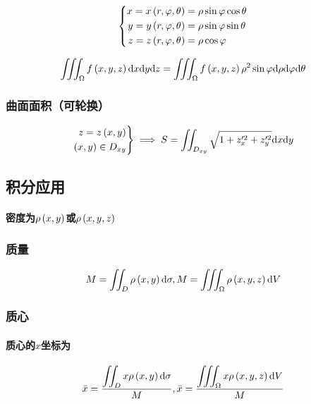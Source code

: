 \documentclass{article}
\begin{document}
\[\left\{\begin{aligned}
        x=x\left(r,\varphi,\theta\right) & =\rho\sin\varphi\cos\theta \\
        y=y\left(r,\varphi,\theta\right) & =\rho\sin\varphi\sin\theta \\
        z=z\left(r,\varphi,\theta\right) & =\rho\cos\varphi           \\
    \end{aligned}\right.\]

\[\iiint_\Omega f\left(x,y,z\right)\mathrm d x\mathrm d y\mathrm d z=
    \iiint_\Omega f\left(x,y,z\right)\rho^2\sin\varphi\mathrm d\rho\mathrm d\varphi\mathrm d\theta\]

\subsubsection{曲面面积（可轮换）}

\[\left.\begin{aligned}
        z=z\left(x,y\right) \\
        \left(x,y\right)\in D_{xy}
    \end{aligned}\right\}\implies
    S=\iint_{D_{xy}}\sqrt{1+z^{\prime2}_x+z^{\prime2}_y}\mathrm d x\mathrm d y\]

\subsection{积分应用}

\paragraph{密度为$\rho\left(x,y\right)$或$\rho\left(x,y,z\right)$}

\subsubsection{质量}

\[M=\iint_D\rho\left(x,y\right)\mathrm d\sigma,
    M=\iiint_\Omega\rho\left(x,y,z\right)\mathrm d V\]

\subsubsection{质心}

\paragraph{质心的$x$坐标为}

\[\bar x=\frac{\displaystyle\iint_Dx\rho\left(x,y\right)\mathrm d\sigma}M,
    \bar x=\frac{\displaystyle\iiint_\Omega x\rho\left(x,y,z\right)\mathrm d V}M\]
\end{document}
